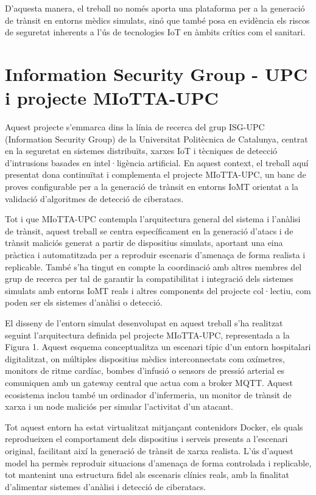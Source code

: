 D’aquesta manera, el treball no només aporta una plataforma per a la generació de trànsit en entorns mèdics simulats, sinó que també posa en evidència els riscos de seguretat inherents a l’ús de tecnologies IoT en àmbits crítics com el sanitari. 

\section{Information Security Group - UPC i projecte MIoTTA-UPC}

Aquest projecte s’emmarca dins la línia de recerca del grup ISG-UPC (Information Security Group) de la Universitat Politècnica de Catalunya, centrat en la seguretat en sistemes distribuïts, xarxes IoT i tècniques de detecció d’intrusions basades en intel·ligència artificial. En aquest context, el treball aquí presentat dona continuïtat i complementa el projecte MIoTTA-UPC, un banc de proves configurable per a la generació de trànsit en entorns IoMT orientat a la validació d’algoritmes de detecció de ciberatacs.

Tot i que MIoTTA-UPC contempla l’arquitectura general del sistema i l’anàlisi de trànsit, aquest treball se centra específicament en la generació d’atacs i de trànsit maliciós generat a partir de dispositius simulats, aportant una eina pràctica i automatitzada per a reproduir escenaris d’amenaça de forma realista i replicable. També s’ha tingut en compte la coordinació amb altres membres del grup de recerca per tal de garantir la compatibilitat i integració dels sistemes simulats amb entorns IoMT reals i altres components del projecte col·lectiu, com poden ser els sistemes d’anàlisi o detecció.

El disseny de l’entorn simulat desenvolupat en aquest treball s’ha realitzat seguint l’arquitectura definida pel projecte MIoTTA-UPC, representada a la Figura 1. Aquest esquema conceptualitza un escenari típic d’un entorn hospitalari digitalitzat, on múltiples dispositius mèdics interconnectats com oxímetres, monitors de ritme cardíac, bombes d’infusió o sensors de pressió arterial es comuniquen amb un gateway central que actua com a broker MQTT. Aquest ecosistema inclou també un ordinador d’infermeria, un monitor de trànsit de xarxa i un node maliciós per simular l’activitat d’un atacant.

Tot aquest entorn ha estat virtualitzat mitjançant contenidors Docker, els quals reprodueixen el comportament dels dispositius i serveis presents a l’escenari original, facilitant així la generació de trànsit de xarxa realista. L’ús d’aquest model ha permès reproduir situacions d’amenaça de forma controlada i replicable, tot mantenint una estructura fidel als escenaris clínics reals, amb la finalitat d’alimentar sistemes d’anàlisi i detecció de ciberatacs.

